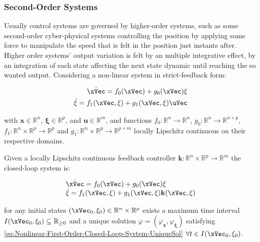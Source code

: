 \subsubsection{Second-Order Systems}
\label{subsub:higher_order_systems}

Usually control systems are governed by higher-order systems, such as some second-order cyber-physical systems controlling the position by applying some force to manipulate the speed that is felt in the position just instants after.  Higher order systems' output variation is felt by an multiple integrative effect, by an integration of each state affecting the next state dynamic until reaching the so wanted output. Considering a non-linear system in strict-feedback form:

\begin{subequations}
    
    \label{eq:HH-NL-System}
    \begin{align}
        \dot{\xVec} = f_0(\xVec) + g_0(\xVec) \mathbf{\xi} 
        \label{eq:HH-NL-System-1stOrder}\\
        \dot{ \mathbf{\xi} } =  f_1(\xVec, \mathbf{\xi}) + g_1(\xVec, \mathbf{\xi}) \uVec
        \label{eq:HH-NL-System-2ndOrder}
    \end{align}
\end{subequations}

with \(\mathbf{x} \in \mathbb{R}^n \), \(\mathbf{\xi} \in \mathbb{R}^p \), and \(\mathbf{u} \in \mathbb{R}^m \), and functions \(f_0: \mathbb{R}^n \to \mathbb{R}^n \), \(g_0: \mathbb{R}^n \to \mathbb{R}^{n \times p} \), \(f_1: \mathbb{R}^n \times \mathbb{R}^p \to \mathbb{R}^p \) and \(g_1: \mathbb{R}^n \times \mathbb{R}^p \to \mathbb{R}^{ p \times m} \) locally Lipschitz continuous on their respective domains. \par
Given a locally Lipschitz continuous feedback controller \(\mathbf{k}: \mathbb{R}^n \times \mathbb{R}^p \to \mathbb{R}^m  \) the closed-loop system is:

\begin{equation}
    \begin{array}{l}
        \dot{\xVec} = f_0(\xVec) + g_0(\xVec) \mathbf{\xi}\\ 
        \dot{ \mathbf{\xi} } =  f_1(\xVec, \mathbf{\xi}) + g_1(\xVec, \mathbf{\xi}) \mathbf{k}(\xVec, \mathbf{\xi})
    \end{array}
 \label{eq:HH-NL-CL-System}
\end{equation}

for any initial states \((\xVec_0, \mathbf{\xi}_0) \in \mathbb{R}^n \times \mathbb{R}^p\) exists a maximum time interval \(I(\xVec_0, \mathbf{\xi}_0) \subseteq \mathbb{R}_{\geq 0}  \) and a unique solution \( \varphi = (\varphi_{\mathbf{x}}, \varphi_{\mathbf{\xi}}) \) satisfying \eqref{eq:Nonlinear-First-Order-Closed-Loop-System-UniqueSol} \(\forall t \in I(\xVec_0, \mathbf{\xi}_0) \). \\



